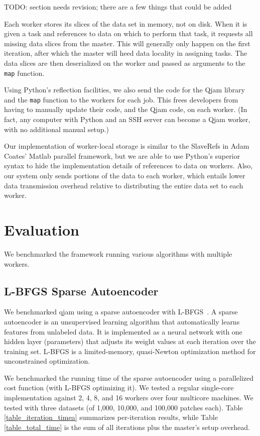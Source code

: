 \documentclass[%
  final,
  notitlepage,
  narroweqnarray,
  inline,
]{ieee}
\begin{document}
TODO: section needs revision; there are a few things that could be added

Each worker stores its slices of the data set in memory, not on disk. When it
is given a task and references to data on which to perform that task, it
requests all missing data slices from the master. This will generally only
happen on the first iteration, after which the master will heed data locality
in assigning tasks. The data slices are then deserialized on the worker and
passed as arguments to the {\tt map} function.

Using Python's reflection facilities, we also send the code for the Qjam
library and the {\tt map} function to the workers for each job. This frees
developers from having to manually update their code, and the Qjam code, on
each worker. (In fact, any computer with Python and an SSH server can become a
Qjam worker, with no additional manual setup.)

Our implementation of worker-local storage is similar to the SlaveRefs in Adam
Coates' Matlab parallel framework, but we are able to use Python's superior
syntax to hide the implementation details of references to data on
workers. Also, our system only sends portions of the data to each worker, which
entails lower data transmission overhead relative to distributing the entire
data set to each worker.



\section{Evaluation}

We benchmarked the framework running various algorithms with multiple workers.

\subsection{L-BFGS Sparse Autoencoder}

We benchmarked qjam using a sparse autoencoder with L-BFGS~\cite{lbfgs}. A
sparse autoencoder is an unsupervised learning algorithm that automatically
learns features from unlabeled data. It is implemented as a neural network with
one hidden layer (parameters) that adjusts its weight values at each iteration
over the training set. L-BFGS is a limited-memory, quasi-Newton optimization
method for unconstrained optimization.

We benchmarked the running time of the sparse autoencoder using a parallelized
cost function (with L-BFGS optimizing it). We tested a regular single-core
implementation against 2, 4, 8, and 16 workers over four multicore machines. We
tested with three datasets (of 1,000, 10,000, and 100,000 patches each). Table
\ref{table_iteration_timea} summarizes per-iteration results, while Table
\ref{table_total_time} is the sum of all iterations plus the master's setup
overhead.
\end{document}
